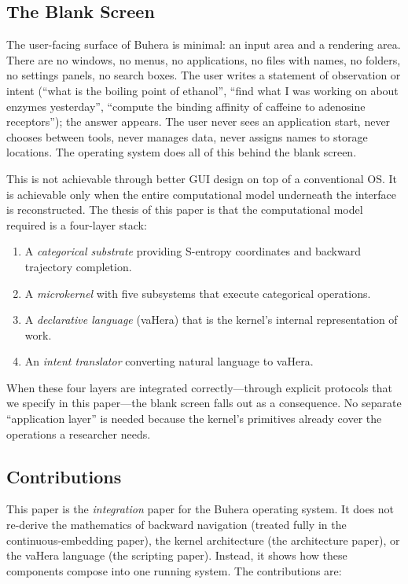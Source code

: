 \documentclass[11pt,twocolumn,a4paper]{article}
\begin{document}
\subsection{The Blank Screen}

The user-facing surface of Buhera is minimal: an input area and a rendering area. There are no windows, no menus, no applications, no files with names, no folders, no settings panels, no search boxes. The user writes a statement of observation or intent (``what is the boiling point of ethanol'', ``find what I was working on about enzymes yesterday'', ``compute the binding affinity of caffeine to adenosine receptors''); the answer appears. The user never sees an application start, never chooses between tools, never manages data, never assigns names to storage locations. The operating system does all of this behind the blank screen.

This is not achievable through better GUI design on top of a conventional OS. It is achievable only when the entire computational model underneath the interface is reconstructed. The thesis of this paper is that the computational model required is a four-layer stack:

\begin{enumerate}[leftmargin=*]
\item A \emph{categorical substrate} providing S-entropy coordinates and backward trajectory completion.
\item A \emph{microkernel} with five subsystems that execute categorical operations.
\item A \emph{declarative language} (vaHera) that is the kernel's internal representation of work.
\item An \emph{intent translator} converting natural language to vaHera.
\end{enumerate}

When these four layers are integrated correctly---through explicit protocols that we specify in this paper---the blank screen falls out as a consequence. No separate ``application layer'' is needed because the kernel's primitives already cover the operations a researcher needs.

\subsection{Contributions}

This paper is the \emph{integration} paper for the Buhera operating system. It does not re-derive the mathematics of backward navigation (treated fully in the continuous-embedding paper), the kernel architecture (the architecture paper), or the vaHera language (the scripting paper). Instead, it shows how these components compose into one running system. The contributions are:
\end{document}
